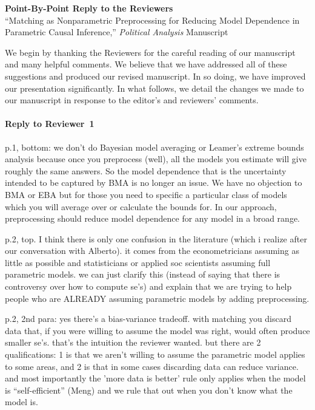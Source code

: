 \documentclass[11pt]{article}
\begin{document}

\begin{center}
  {\bf \Large Point-By-Point Reply to the Reviewers}\\
  ``Matching as Nonparametric Preprocessing for Reducing Model
  Dependence in Parametric Causal Inference,'' {\it Political
  Analysis} Manuscript
\end{center}

We begin by thanking the Reviewers for the careful reading of our
manuscript and many helpful comments.  We believe that we have
addressed all of these suggestions and produced our revised
manuscript. In so doing, we have improved our presentation
significantly. In what follows, we detail the changes we made to our
manuscript in response to the editor's and reviewers' comments.

\paragraph{Reply to Reviewer~1}

p.1, bottom: we don't do Bayesian model averaging or Leamer's extreme
bounds analysis because once you preprocess (well), all the models you
estimate will give roughly the same answers.  So the model dependence
that is the uncertainty intended to be captured by BMA is no longer an
issue.  We have no objection to BMA or EBA but for those you need to
specific a particular class of models which you will average over or
calculate the bounds for.  In our approach, preprocessing should
reduce model dependence for any model in a broad range.

p.2, top.  I think there is only one confusion in the literature
(which i realize after our conversation with Alberto). it comes from
the econometricians assuming as little as possible and statisticians
or applied soc scientists assuming full parametric models.  we can
just clarify this (instead of saying that there is controversy over
how to compute se's) and explain that we are trying to help people who
are ALREADY assuming parametric models by adding preprocessing.

p.2, 2nd para: yes there's a bias-variance tradeoff.  with matching
you discard data that, if you were willing to assume the model was
right, would often produce smaller se's.  that's the intuition the
reviewer wanted. but there are 2 qualifications:  1 is that we aren't
willing to assume the parametric model applies to some areas, and 2 is
that in some cases discarding data can reduce variance.  and most
importantly the 'more data is better' rule only applies when the model
is ``self-efficient'' (Meng) and we rule that out when you don't know
what the model is.
\end{document}
